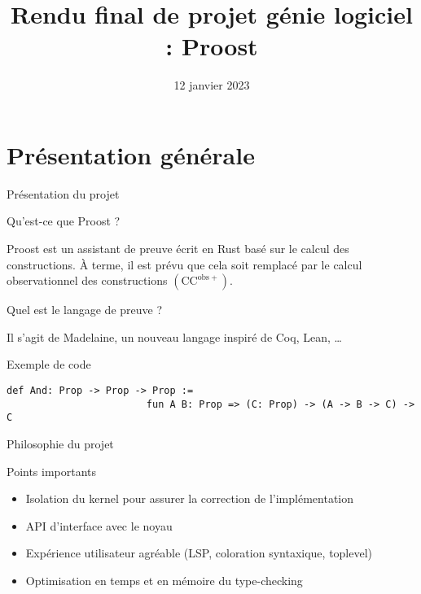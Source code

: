 \documentclass[12pt, aspectratio=169]{beamer}
\title[Rendu final : Proost]{Rendu final de projet génie logiciel : Proost}
\author[Projet génie logiciel]{
    \normalsize
    Arthur~Adjedj \and
    Augustin~Albert \and \\
    Vincent~Lafeychine \and
    Lucas~Tabary-Maujean \and \\ \vspace{0.2cm}
    {\footnotesize
      Jean~Abou-Samra \and
      Tanguy~Bozec \and
      Antonin~Bretagne \and
      Vivien~Ducros \and
      Antoine~Guilmin-Crépon \and
      Balthazar~Patiachvili}
}
\date{12 janvier 2023}
\institute[]{ENS Paris-Saclay}
\begin{document}
    \beamertemplatenavigationsymbolsempty
    \maketitle

    \section{Présentation générale}

        \begin{frame}[fragile]{Présentation du projet}

            \begin{block}{Qu'est-ce que Proost ?}

                Proost est un assistant de preuve écrit en Rust basé sur le calcul des constructions. À terme, il est prévu que cela soit remplacé par le calcul observationnel des constructions $\left(\mathrm{CC}^{\mathrm{obs}+}\right)$.

            \end{block} \pause

            \begin{block}{Quel est le langage de preuve ?}

                Il s'agit de Madelaine, un nouveau langage inspiré de Coq, Lean, \dots

            \end{block} \pause

            \begin{exampleblock}{Exemple de code}

                \begin{lstlisting}[language=mdln]
                    def And: Prop -> Prop -> Prop :=
                        fun A B: Prop => (C: Prop) -> (A -> B -> C) -> C
                \end{lstlisting}

            \end{exampleblock}

        \end{frame}

        \begin{frame}{Philosophie du projet}

            \begin{alertblock}{Points importants}

                \begin{itemize}
                    \item Isolation du kernel pour assurer la correction de l'implémentation \pause
                    \item API d'interface avec le noyau \pause
                    \item Expérience utilisateur agréable (LSP, coloration syntaxique, toplevel) \pause
                    \item Optimisation en temps et en mémoire du type-checking
                \end{itemize}

            \end{alertblock}

        \end{frame}
\end{document}

